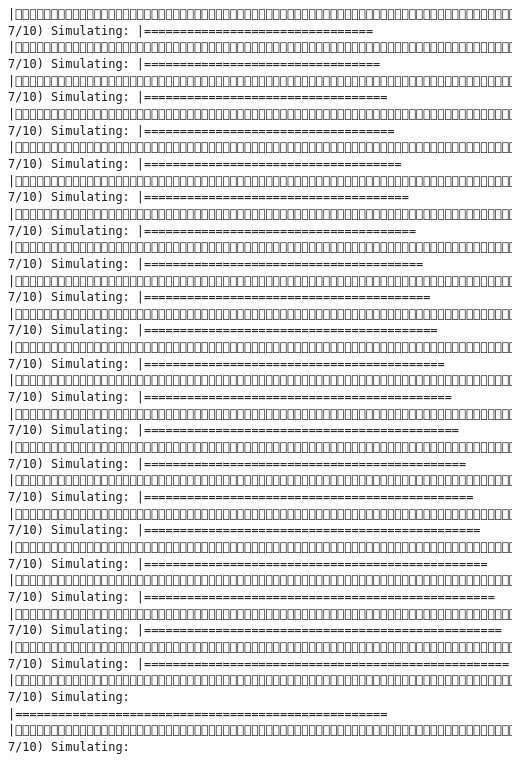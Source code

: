 \documentclass[]{article}
\begin{document}
\begin{verbatim}
|( 7/10) Simulating: |================================                     |( 7/10) Simulating: |=================================                    |( 7/10) Simulating: |==================================                   |( 7/10) Simulating: |===================================                  |( 7/10) Simulating: |====================================                 |( 7/10) Simulating: |=====================================                |( 7/10) Simulating: |======================================               |( 7/10) Simulating: |=======================================              |( 7/10) Simulating: |========================================             |( 7/10) Simulating: |=========================================            |( 7/10) Simulating: |==========================================           |( 7/10) Simulating: |===========================================          |( 7/10) Simulating: |============================================         |( 7/10) Simulating: |=============================================        |( 7/10) Simulating: |==============================================       |( 7/10) Simulating: |===============================================      |( 7/10) Simulating: |================================================     |( 7/10) Simulating: |=================================================    |( 7/10) Simulating: |==================================================   |( 7/10) Simulating: |===================================================  |( 7/10) Simulating: |==================================================== |( 7/10) Simulating: 
\end{verbatim}
\end{document}
